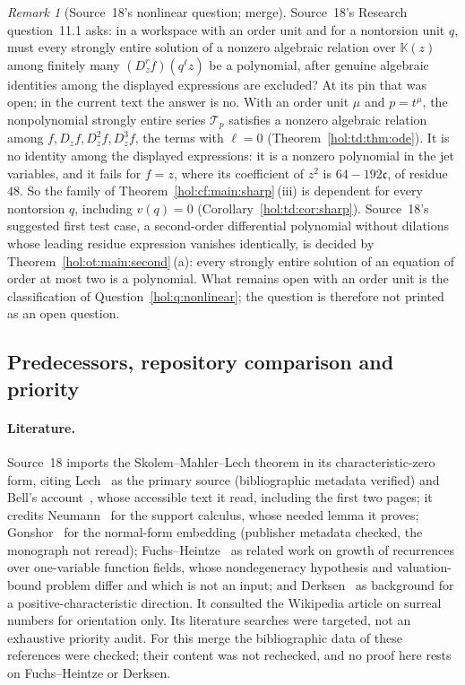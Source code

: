 \documentclass[11pt]{article}
\numberwithin{equation}{section}
\theoremstyle{definition}
\theoremstyle{remark}
\newtheorem{remark}[theorem]{Remark}
\newcommand{\KK}{\mathbb K}
\begin{document}
\begin{remark}[Source~18's nonlinear question; merge]
\label{hol:ud:rem:nonlinearq}
Source~18's Research question~11.1 asks: in a workspace with an order unit
and for a nontorsion unit $q$, must every strongly entire solution of a
nonzero algebraic relation over $\KK(z)$ among finitely many
$(D_z^rf)(q^\ell z)$ be a polynomial, after genuine algebraic identities among
the displayed expressions are excluded? At its pin that was open; in the
current text the answer is no. With an order unit $\mu$ and $p=t^\mu$, the
nonpolynomial strongly entire series $\mathcal T_p$ satisfies a nonzero
algebraic relation among $f,D_zf,D_z^2f,D_z^3f$, the terms with $\ell=0$
(Theorem~\ref{hol:td:thm:ode}). It is no identity among the displayed
expressions: it is a nonzero polynomial in the jet variables, and it fails for
$f=z$, where its coefficient of $z^2$ is $64-192\mathfrak c$, of residue
$48$. So the family of Theorem~\ref{hol:cf:main:sharp}\,(iii) is dependent for
every nontorsion $q$, including $v(q)=0$ (Corollary~\ref{hol:td:cor:sharp}).
Source~18's suggested first test case, a second-order differential polynomial
without dilations whose leading residue expression vanishes identically, is
decided by Theorem~\ref{hol:ot:main:second}\,(a): every strongly entire
solution of an equation of order at most two is a polynomial. What remains
open with an order unit is the classification of
Question~\ref{hol:q:nonlinear}; the question is therefore not printed as an
open question.
\end{remark}

\subsection{Predecessors, repository comparison and priority}
\label{hol:ud:sub:predecessors}

\paragraph{Literature.}
Source~18 imports the Skolem--Mahler--Lech theorem in its characteristic-zero
form, citing Lech~\cite{lech} as the primary source (bibliographic metadata
verified) and Bell's account~\cite{belldoc}, whose accessible text it read,
including the first two pages; it credits Neumann~\cite{neumann} for the
support calculus, whose needed lemma it proves; Gonshor~\cite{gonshor} for
the normal-form embedding (publisher metadata checked, the monograph not
reread); Fuchs--Heintze~\cite{fuchsheintze} as related work on growth of
recurrences over one-variable function fields, whose nondegeneracy hypothesis
and valuation-bound problem differ and which is not an input; and
Derksen~\cite{derksen} as background for a positive-characteristic
direction. It consulted the Wikipedia article on surreal numbers for
orientation only. Its literature searches were targeted, not an exhaustive
priority audit. For this merge the bibliographic data of these references
were checked; their content was not rechecked, and no proof here rests on
Fuchs--Heintze or Derksen.
\end{document}
